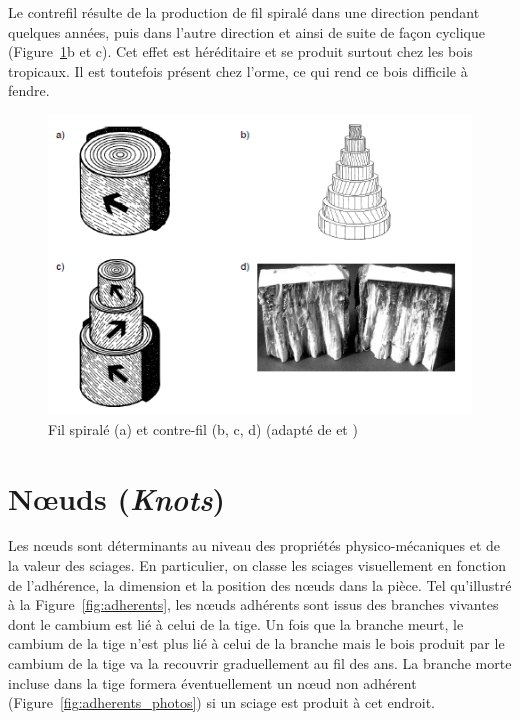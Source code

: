 Le contrefil résulte de la production de fil spiralé dans une direction pendant quelques années, puis dans l'autre direction et ainsi de suite de façon cyclique (Figure~\ref{fig:contrefil}b et c). Cet effet est héréditaire et se produit surtout chez les bois tropicaux. Il est toutefois présent chez l'orme, ce qui rend ce bois difficile à fendre.

\begin{figure}[h]
	\centering
	\includegraphics[scale=1]{img/ch9_contrefil}
	\caption{Fil spiralé (a) et contre-fil (b, c, d) (adapté de \cite{bowyer2007forest} et \cite{hoadley1990identifying})}
	\label{fig:contrefil}
\end{figure}

\section{Nœuds (\textit{Knots})}

Les nœuds sont déterminants au niveau des propriétés physico-mécaniques et de la valeur des sciages. En particulier, on classe les sciages visuellement en fonction de l'adhérence, la dimension et la position des nœuds dans la pièce. Tel qu'illustré à la Figure~\ref{fig:adherents}, les nœuds adhérents sont issus des branches vivantes dont le cambium est lié à celui de la tige. Un fois que la branche meurt, le cambium de la tige n'est plus lié à celui de la branche mais le bois produit par le cambium de la tige va la recouvrir graduellement au fil des ans. La branche morte incluse dans la tige formera éventuellement un nœud non adhérent (Figure~\ref{fig:adherents_photos}) si un sciage est produit à cet endroit.


